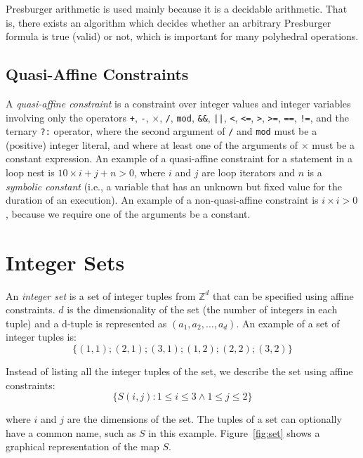 Presburger arithmetic is used mainly because it is a decidable arithmetic.
That is, there exists an algorithm which decides whether an arbitrary Presburger formula is true (valid) or not, which is important for many polyhedral operations.


\subsection{Quasi-Affine Constraints}
\label{qaffine}

A \emph{quasi-affine constraint} is a constraint over integer values and integer variables involving only the operators \lstinline{+}, \lstinline{-}, $\times$, \lstinline{/}, \lstinline{mod}, \lstinline{&&}, \lstinline{||}, \lstinline{<}, \lstinline{<=}, \lstinline{>}, \lstinline{>=}, \lstinline{==}, \lstinline{!=}, and the ternary \lstinline{?:} operator, where the second argument of \lstinline{/} and \lstinline{mod} must be a (positive) integer literal, and where at
least one of the arguments of $\times$
must be a constant expression.
An example of a quasi-affine constraint for a statement in a loop nest is $10\times i+j+n>0$, where $i$ and $j$ are loop iterators and $n$ is a
\emph{symbolic constant} (i.e., a variable that has an unknown but fixed value for the duration of
an execution).  An example of a non-quasi-affine constraint is $i \times i>0$, because we require one of the arguments be a constant.


\section{Integer Sets}

An \emph{integer set} is a set of integer tuples from $\mathbb{Z}^d$ that can be specified using  affine constraints. $d$ is the dimensionality of the set (the number of integers in each tuple) and a d-tuple is represented as $(a_1, a_2, \dots, a_d)$.  An example of a set of integer tuples is:
$$\{(1,1); (2,1); (3,1); (1,2); (2,2); (3,2)\}$$

Instead of listing all the integer tuples of the set, we describe the set using affine constraints:
$$\{S(i,j): 1 \leq i \leq 3 \wedge 1 \leq j \leq 2\}$$

\noindent where $i$ and $j$ are the dimensions of the set.
The tuples of a set can optionally have a common name, such as
$S$ in this example.
Figure~\ref{fig:set} shows a graphical representation of the map $S$.

